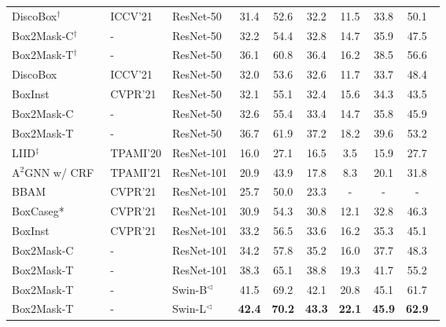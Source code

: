 \documentclass[12pt,onecolumn,letterpaper]{article}
\begin{document}
\begin{table*}[t]
{{\begin{tabular}{lllcccccc}
			DiscoBox$^\dag$~\cite{iccv2021discobox} &ICCV'21 & ResNet-50 & 31.4 & 52.6 & 32.2 & 11.5 & 33.8 & 50.1~ \\
			
			\rowcolor{gray!8}
			Box2Mask-C$^\dag$ & - & ResNet-50 & 32.2 & 54.4 & 32.8 & 14.7& 35.9 & 47.5~ \\
			\rowcolor{gray!8}
			Box2Mask-T$^\dag$ & - & ResNet-50 & 36.1 & 60.8 & 36.4 & 16.2 & 38.5 & 56.6~  \\
			\midrule
			DiscoBox~\cite{iccv2021discobox} &ICCV'21 & ResNet-50 & 32.0 & 53.6 & 32.6 & 11.7 & 33.7 & 48.4~ \\
			
			BoxInst~\cite{cvpr2021_boxinst} & CVPR'21 & ResNet-50 & 32.1 & 55.1 & 32.4 & 15.6 & 34.3& 43.5~ \\
			
			\rowcolor{gray!8}
			Box2Mask-C & - & ResNet-50 & 32.6 & 55.4& 33.4 & 14.7& 35.8 & 45.9~ \\
			
			\rowcolor{gray!8}
			Box2Mask-T  & -&ResNet-50 & 36.7 & 61.9 & 37.2 & 18.2 & 39.6 & 53.2~ \\
			\midrule
			LIID$^\ddag$~\cite{tpami2020leveraging} & TPAMI'20 & ResNet-101 & 16.0 & 27.1 & 16.5 & 3.5 & 15.9 & 27.7~\\
			A$^2$GNN w/ CRF~\cite{TPAMI2021affinity} & TPAMI'21 & ResNet-101 & 20.9 & 43.9 & 17.8 & 8.3 & 20.1 & 31.8~\\
			
			BBAM~\cite{cvpr2021bbam} & CVPR'21 &ResNet-101 & 25.7 & 50.0& 23.3 & - & -& -~ \\ 
			
			BoxCaseg*~\cite{cvpr2021boxcaseg} &CVPR'21 & ResNet-101  &30.9 & 54.3 & 30.8 & 12.1 & 32.8 & 46.3~ \\
			
			BoxInst~\cite{cvpr2021_boxinst} & CVPR'21 & ResNet-101 & 33.2 & 56.5& 33.6& 16.2& 35.3& 45.1~ \\
			
			\rowcolor{gray!8}
			Box2Mask-C & - & ResNet-101 & 34.2 & 57.8 & 35.2 & 16.0 & 37.7 & 48.3~ \\
			\rowcolor{gray!8} 
			Box2Mask-T  & - & ResNet-101 & 38.3 & 65.1 & 38.8 & 19.3 & 41.7 & 55.2~  \\

			\rowcolor{gray!8}
			Box2Mask-T & -& Swin-B$^\triangleleft$ & 41.5 & 69.2 & 42.1 & 20.8 & 45.1 & 61.7~  \\
			\rowcolor{gray!8}
			Box2Mask-T & - & Swin-L$^\triangleleft$ & \textbf{42.4} & \textbf{70.2} & \textbf{43.3} & \textbf{22.1} & \textbf{45.9} & \textbf{62.9}~ \\
			\bottomrule
	\end{tabular}}}
	\label{tab:coco_results}
\end{table*}
\end{document}
